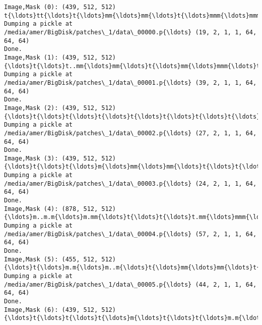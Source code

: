 \documentclass[11pt]{article}
\begin{document}
    \begin{Verbatim}[commandchars=\\\{\}]
Image,Mask (0): (439, 512, 512)
t{\ldots}tt{\ldots}t{\ldots}mm{\ldots}mm{\ldots}t{\ldots}mmm{\ldots}mmm{\ldots}m{\ldots}m{\ldots}t{\ldots}t{\ldots}
Dumping a pickle at /media/amer/BigDisk/patches\_1/data\_00000.p{\ldots} (19, 2, 1, 1, 64, 64, 64)
Done.
Image,Mask (1): (439, 512, 512)
{\ldots}t{\ldots}t..mm{\ldots}mm{\ldots}t{\ldots}mm{\ldots}mmm{\ldots}t{\ldots}mm{\ldots}t{\ldots}t.t{\ldots}mm{\ldots}mmm{\ldots}mm{\ldots}mmm{\ldots}t..mmm{\ldots}mm{\ldots}t{\ldots}t{\ldots}t{\ldots}t{\ldots}t{\ldots}
Dumping a pickle at /media/amer/BigDisk/patches\_1/data\_00001.p{\ldots} (39, 2, 1, 1, 64, 64, 64)
Done.
Image,Mask (2): (439, 512, 512)
{\ldots}t{\ldots}t{\ldots}t{\ldots}t{\ldots}t{\ldots}t{\ldots}t{\ldots}t{\ldots}t{\ldots}t{\ldots}t{\ldots}mm{\ldots}mmm..t{\ldots}mm{\ldots}t{\ldots}m{\ldots}t{\ldots}t{\ldots}t{\ldots}t{\ldots}t{\ldots}t
Dumping a pickle at /media/amer/BigDisk/patches\_1/data\_00002.p{\ldots} (27, 2, 1, 1, 64, 64, 64)
Done.
Image,Mask (3): (439, 512, 512)
{\ldots}t{\ldots}t{\ldots}m{\ldots}mm{\ldots}mm{\ldots}t{\ldots}t{\ldots}m{\ldots}mm{\ldots}m.t{\ldots}m{\ldots}mmm{\ldots}t{\ldots}m{\ldots}t{\ldots}t{\ldots}t{\ldots}t{\ldots}
Dumping a pickle at /media/amer/BigDisk/patches\_1/data\_00003.p{\ldots} (24, 2, 1, 1, 64, 64, 64)
Done.
Image,Mask (4): (878, 512, 512)
{\ldots}m..m.m{\ldots}m.mm{\ldots}t{\ldots}t{\ldots}t.mm{\ldots}mmm{\ldots}mm{\ldots}t{\ldots}mm.m{\ldots}mmm{\ldots}mm{\ldots}t{\ldots}t{\ldots}mm{\ldots}mmm{\ldots}m{\ldots}t{\ldots}t{\ldots}t{\ldots}t{\ldots}t{\ldots}t{\ldots}t{\ldots}t{\ldots}t{\ldots}t{\ldots}t{\ldots}t{\ldots}t{\ldots}t{\ldots}t{\ldots}t{\ldots}t{\ldots}t{\ldots}t{\ldots}t{\ldots}t{\ldots}t{\ldots}t{\ldots}t{\ldots}
Dumping a pickle at /media/amer/BigDisk/patches\_1/data\_00004.p{\ldots} (57, 2, 1, 1, 64, 64, 64)
Done.
Image,Mask (5): (455, 512, 512)
{\ldots}t{\ldots}m.m{\ldots}m..m{\ldots}t{\ldots}mm{\ldots}mm{\ldots}t{\ldots}m{\ldots}mm{\ldots}mm{\ldots}t{\ldots}m{\ldots}mmmm{\ldots}t..tmmm..m{\ldots}t{\ldots}m{\ldots}mm{\ldots}mm{\ldots}m{\ldots}t.m{\ldots}t{\ldots}t{\ldots}t{\ldots}t{\ldots}t{\ldots}t.t{\ldots}
Dumping a pickle at /media/amer/BigDisk/patches\_1/data\_00005.p{\ldots} (44, 2, 1, 1, 64, 64, 64)
Done.
Image,Mask (6): (439, 512, 512)
{\ldots}t{\ldots}t{\ldots}t{\ldots}m{\ldots}t{\ldots}t{\ldots}m.m{\ldots}m.m{\ldots}m.mm{\ldots}t{\ldots}mmmm{\ldots}mmmm{\ldots}mm{\ldots}t{\ldots}t{\ldots}mmmm{\ldots}mmm.m{\ldots}t{\ldots}t{\ldots}t{\ldots}t{\ldots}t{\ldots}
    \end{Verbatim}
\end{document}
